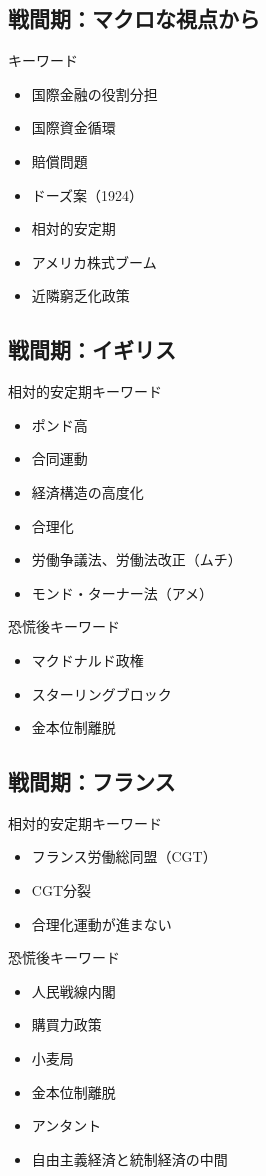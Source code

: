 \documentclass{jsarticle}
\begin{document}
\subsection{戦間期：マクロな視点から}
キーワード
\begin{itemize}
\item 国際金融の役割分担
\item 国際資金循環
\item 賠償問題
\item ドーズ案（1924）
\item 相対的安定期
\item アメリカ株式ブーム
\item 近隣窮乏化政策
\end{itemize}

\subsection{戦間期：イギリス}
相対的安定期キーワード
\begin{itemize}
\item ポンド高
\item 合同運動
\item 経済構造の高度化
\item 合理化
\item 労働争議法、労働法改正（ムチ）
\item モンド・ターナー法（アメ）
\end{itemize}
恐慌後キーワード
\begin{itemize}
\item マクドナルド政権
\item スターリングブロック
\item 金本位制離脱
\end{itemize}

\subsection{戦間期：フランス}
相対的安定期キーワード
\begin{itemize}
\item フランス労働総同盟（CGT）
\item CGT分裂
\item 合理化運動が進まない
\end{itemize}
恐慌後キーワード
\begin{itemize}
\item 人民戦線内閣
\item 購買力政策
\item 小麦局
\item 金本位制離脱
\item アンタント
\item 自由主義経済と統制経済の中間
\end{itemize}
\end{document}
